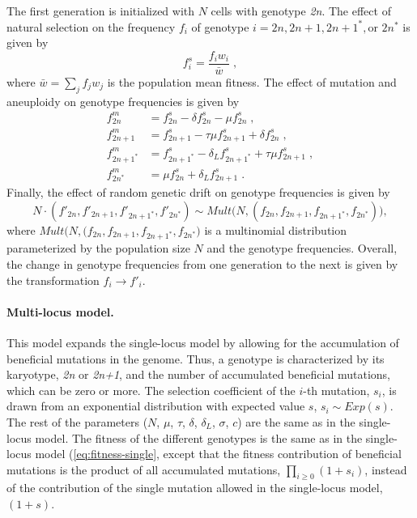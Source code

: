 \documentclass[12pt]{extarticle}
\newcommand{\euwt}{\emph{2n}}
\newcommand{\anwt}{\emph{2n+1}}
\begin{document}
The first generation is initialized with $N$ cells with genotype \euwt.
The effect of natural selection on the frequency $f_i$ of genotype $i = 2n, 2n+1, 2n+1^*, \text{or } 2n^*$ is given by
    \begin{equation} \label{eq:selection-single} 
      f^s_i = \frac{f_i w_i}{\bar{w}} \;,
    \end{equation}
where $\bar{w} = \sum_{j}{f_j w_j}$ is the population mean fitness.
The effect of mutation and aneuploidy on genotype frequencies is given by
    \begin{equation} \label{eq:mutation-aneuploidy-single}
    \begin{aligned}
      f^m_{2n} & = {f^s_{2n} - \delta f^s_{2n} - \mu f^s_{2n}}  \;,\\
      f^m_{2n+1} & = {f^s_{2n+1} - \tau \mu f^s_{2n+1} + \delta f^s_{2n}}  \;,\\
      f^m_{2n+1^*} & = {f^s_{2n+1^*} - \delta_L f^s_{2n+1^*} + \tau \mu f^s_{2n+1}}  \;,\\
      f^m_{2n^*} & = {\mu f^s_{2n} + \delta_L f^s_{2n+1}}  \;.
    \end{aligned}
    \end{equation}
Finally, the effect of random genetic drift on genotype frequencies is given by
    \begin{equation} \label{eq:drift-single} 
      N \cdot (f'_{2n},f'_{2n+1},f'_{2n+1^*},f'_{2n^*}) \sim Mult\Big(N, (f_{2n},f_{2n+1},f_{2n+1^*},f_{2n^*})\Big),
    \end{equation}
where $Mult\Big(N, (f_{2n},f_{2n+1},f_{2n+1^*},f_{2n^*}\Big)$ is a multinomial distribution parameterized by the population size $N$ and the genotype frequencies.
Overall, the change in genotype frequencies from one generation to the next is given by the transformation $f_i \to f'_i$.

\paragraph*{Multi-locus model.}
This model expands the single-locus model by allowing for the accumulation of beneficial mutations in the genome. Thus, a genotype is characterized by its karyotype, \euwt\; or \anwt, and the number of accumulated beneficial mutations, which can be zero or more.
The selection coefficient of the $i$-th mutation, $s_i$, is drawn from an exponential distribution with expected value $s$, $s_i \sim Exp(s)$.
The rest of the parameters ($N$, $\mu$, $\tau$, $\delta$, $\delta_L$, $\sigma$, $c$) are the same as in the single-locus model.
The fitness of the different genotypes is the same as in the single-locus model (\autoref{eq:fitness-single}, except that the fitness contribution of beneficial mutations is the product of all accumulated mutations, $\prod_{i \ge 0}(1+s_i)$, instead of the contribution of the single mutation allowed in the single-locus model, $(1+s)$.
\end{document}
